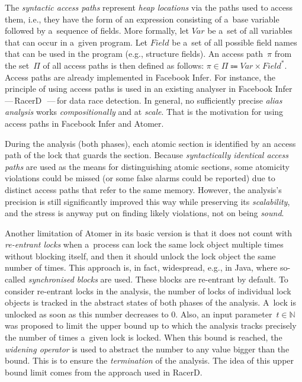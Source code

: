 \documentclass{ExcelAtFIT}
\theoremstyle{example}
\begin{document}
The \emph{syntactic access paths} represent \emph{heap locations} via the paths used to access them, i.e., they have the form of an expression consisting of a~base variable followed by a~sequence of fields. More formally, let $ Var $ be a~set of all variables that can occur in a~given program. Let $ Field $ be a~set of all possible field names that can be used in the program (e.g., structure fields). An access path~$ \pi $ from the set~$ \Pi $ of all access paths is then defined as follows: $ \pi \in \Pi \Coloneqq Var \times Field^* $. Access paths are already implemented in Facebook Infer. For instance, the principle of using access paths is used in an existing analyser in Facebook Infer\,---\,RacerD~\cite{racerD}\,---\,for data race detection. In general, no sufficiently precise \emph{alias analysis} works \emph{compositionally} and at \emph{scale}. That is the motivation for using access paths in Facebook Infer and Atomer.

During the analysis (both phases), each atomic section is identified by an access path of the lock that guards the section. Because \emph{syntactically identical access paths} are used as the means for distinguishing atomic sections, some atomicity violations could be missed (or some false alarms could be reported) due to distinct access paths that refer to the same memory. However, the analysis's precision is still significantly improved this way while preserving its \emph{scalability}, and the stress is anyway put on finding likely violations, not on being \emph{sound}.

Another limitation of Atomer in its basic version is that it does not count with \emph{re-entrant locks} when a~process can lock the same lock object multiple times without blocking itself, and then it should unlock the lock object the same number of times. This approach is, in fact, widespread, e.g., in Java, where so-called \emph{synchronised blocks} are used. These blocks are re-entrant by default. To consider re-entrant locks in the analysis, the number of locks of individual lock objects is tracked in the abstract states of both phases of the analysis. A~lock is unlocked as soon as this number decreases to 0. Also, an input parameter~$ t \in \mathbb{N} $ was proposed to limit the upper bound up to which the analysis tracks precisely the number of times a~given lock is locked. When this bound is reached, the \emph{widening operator} is used to abstract the number to any value bigger than the bound. This is to ensure the \emph{termination} of the analysis. The idea of this upper bound limit comes from the approach used in RacerD.
\end{document}
